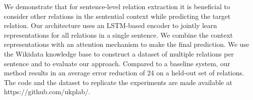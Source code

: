 We demonstrate that for sentence-level relation extraction it is beneficial to consider other relations in the sentential context while predicting the target relation. Our architecture uses an LSTM-based encoder to jointly learn representations for all relations in a single sentence.  We combine the context representations with an attention mechanism to make the final prediction. We use the Wikidata knowledge base to construct a dataset of multiple relations per sentence and to evaluate our approach. Compared to a baseline system, our method results in an average error reduction of 24 on a held-out set of relations. The code and the dataset to replicate the experiments are made available at https://github.com/ukplab/.
